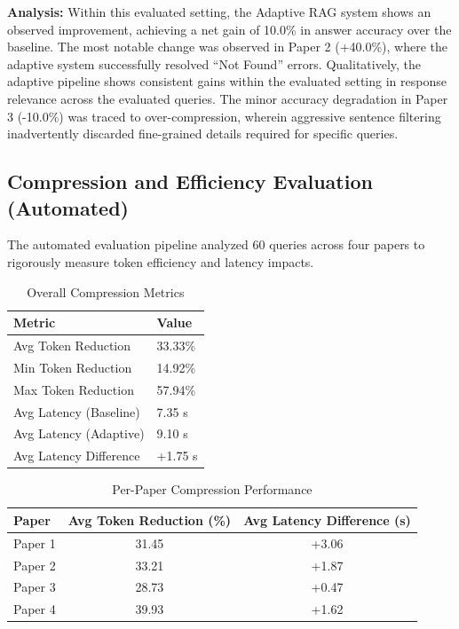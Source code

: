 \documentclass[conference]{IEEEtran}
\begin{document}
\textbf{Analysis:} Within this evaluated setting, the Adaptive RAG system shows an observed improvement, achieving a net gain of 10.0\% in answer accuracy over the baseline. The most notable change was observed in Paper 2 (+40.0\%), where the adaptive system successfully resolved ``Not Found'' errors. Qualitatively, the adaptive pipeline shows consistent gains within the evaluated setting in response relevance across the evaluated queries. The minor accuracy degradation in Paper 3 (-10.0\%) was traced to over-compression, wherein aggressive sentence filtering inadvertently discarded fine-grained details required for specific queries. 

\subsection{Compression and Efficiency Evaluation (Automated)}
The automated evaluation pipeline analyzed 60 queries across four papers to rigorously measure token efficiency and latency impacts.

\begin{table}[htb]
\centering
\caption{Overall Compression Metrics}
\label{tab:overall_comp}
\begin{tabular}{@{}ll@{}}
\toprule
\textbf{Metric} & \textbf{Value} \\
\midrule
Avg Token Reduction & 33.33\% \\
Min Token Reduction & 14.92\% \\
Max Token Reduction & 57.94\% \\
Avg Latency (Baseline) & 7.35 s \\
Avg Latency (Adaptive) & 9.10 s \\
Avg Latency Difference & +1.75 s \\
\bottomrule
\end{tabular}
\end{table}

\begin{table}[htb]
\centering
\caption{Per-Paper Compression Performance}
\label{tab:paper_comp}
\begin{tabular}{@{}lcc@{}}
\toprule
\textbf{Paper} & \textbf{Avg Token Reduction (\%)} & \textbf{Avg Latency Difference (s)} \\
\midrule
Paper 1 & 31.45 & +3.06 \\
Paper 2 & 33.21 & +1.87 \\
Paper 3 & 28.73 & +0.47 \\
Paper 4 & 39.93 & +1.62 \\
\bottomrule
\end{tabular}
\end{table}
\end{document}
